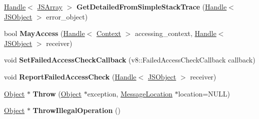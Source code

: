 \begin{DoxyCompactItemize}
\item 
\hyperlink{classv8_1_1internal_1_1_handle}{Handle}$<$ \hyperlink{classv8_1_1internal_1_1_j_s_array}{J\+S\+Array} $>$ {\bfseries Get\+Detailed\+From\+Simple\+Stack\+Trace} (\hyperlink{classv8_1_1internal_1_1_handle}{Handle}$<$ \hyperlink{classv8_1_1internal_1_1_j_s_object}{J\+S\+Object} $>$ error\+\_\+object)\hypertarget{classv8_1_1internal_1_1_isolate_ae8317e72e704ed8d22a581771c5a2f03}{}\label{classv8_1_1internal_1_1_isolate_ae8317e72e704ed8d22a581771c5a2f03}

\item 
bool {\bfseries May\+Access} (\hyperlink{classv8_1_1internal_1_1_handle}{Handle}$<$ \hyperlink{classv8_1_1internal_1_1_context}{Context} $>$ accessing\+\_\+context, \hyperlink{classv8_1_1internal_1_1_handle}{Handle}$<$ \hyperlink{classv8_1_1internal_1_1_j_s_object}{J\+S\+Object} $>$ receiver)\hypertarget{classv8_1_1internal_1_1_isolate_a81eb739b22c25b62bdab490e2374def0}{}\label{classv8_1_1internal_1_1_isolate_a81eb739b22c25b62bdab490e2374def0}

\item 
void {\bfseries Set\+Failed\+Access\+Check\+Callback} (v8\+::\+Failed\+Access\+Check\+Callback callback)\hypertarget{classv8_1_1internal_1_1_isolate_a38513744361edd89febeaeb7bd77c2a0}{}\label{classv8_1_1internal_1_1_isolate_a38513744361edd89febeaeb7bd77c2a0}

\item 
void {\bfseries Report\+Failed\+Access\+Check} (\hyperlink{classv8_1_1internal_1_1_handle}{Handle}$<$ \hyperlink{classv8_1_1internal_1_1_j_s_object}{J\+S\+Object} $>$ receiver)\hypertarget{classv8_1_1internal_1_1_isolate_aff4443be20e188c51cdf69cddc0efad1}{}\label{classv8_1_1internal_1_1_isolate_aff4443be20e188c51cdf69cddc0efad1}

\item 
\hyperlink{classv8_1_1internal_1_1_object}{Object} $\ast$ {\bfseries Throw} (\hyperlink{classv8_1_1internal_1_1_object}{Object} $\ast$exception, \hyperlink{classv8_1_1internal_1_1_message_location}{Message\+Location} $\ast$location=N\+U\+LL)\hypertarget{classv8_1_1internal_1_1_isolate_a89faf8cf2d7ccf54daf3c837cf8b31f2}{}\label{classv8_1_1internal_1_1_isolate_a89faf8cf2d7ccf54daf3c837cf8b31f2}

\item 
\hyperlink{classv8_1_1internal_1_1_object}{Object} $\ast$ {\bfseries Throw\+Illegal\+Operation} ()\hypertarget{classv8_1_1internal_1_1_isolate_a1d294e4525d768e83637f9f49e76d9ee}{}\label{classv8_1_1internal_1_1_isolate_a1d294e4525d768e83637f9f49e76d9ee}


\end{DoxyCompactItemize}
